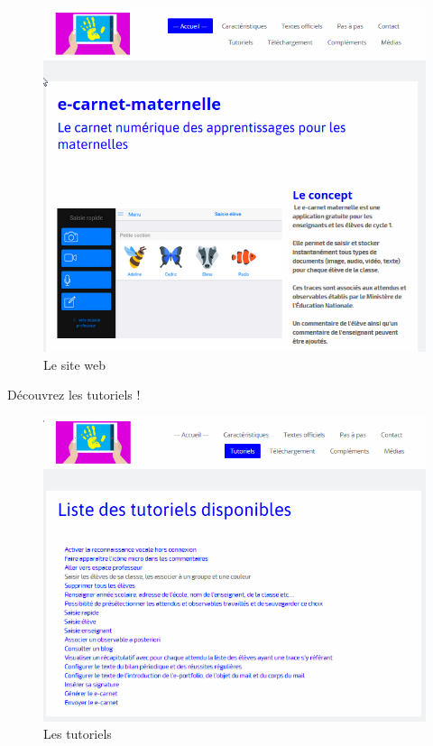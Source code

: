 \documentclass[oneside]{book}
\begin{document}
\begin{figure}
\centering
\includegraphics{./screenshots/2018-02-06-06-39-29.png}
\caption{Le site web}
\end{figure}

Découvrez les tutoriels !

\begin{figure}
\centering
\includegraphics{./screenshots/2018-02-06-06-40-51.png}
\caption{Les tutoriels}
\end{figure}
\end{document}
